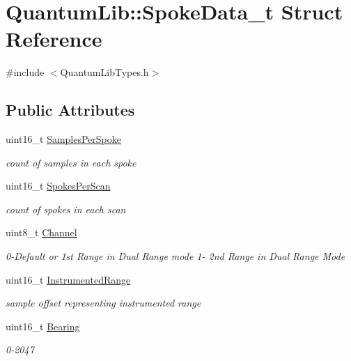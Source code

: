 \hypertarget{struct_quantum_lib_1_1_spoke_data__t}{}\section{Quantum\+Lib\+:\+:Spoke\+Data\+\_\+t Struct Reference}
\label{struct_quantum_lib_1_1_spoke_data__t}


{\ttfamily \#include $<$Quantum\+Lib\+Types.\+h$>$}

\subsection*{Public Attributes}
\begin{DoxyCompactItemize}
\item 
uint16\+\_\+t \mbox{\hyperlink{struct_quantum_lib_1_1_spoke_data__t_afa2843600eaccb38db739a8bd7e468dd}{Samples\+Per\+Spoke}}
\begin{DoxyCompactList}\small\item\em count of samples in each spoke \end{DoxyCompactList}\item 
uint16\+\_\+t \mbox{\hyperlink{struct_quantum_lib_1_1_spoke_data__t_abca160974e76a8a333a1927d1896fc69}{Spokes\+Per\+Scan}}
\begin{DoxyCompactList}\small\item\em count of spokes in each scan \end{DoxyCompactList}\item 
uint8\+\_\+t \mbox{\hyperlink{struct_quantum_lib_1_1_spoke_data__t_a235bdd0acf5a02fe888939c909de9566}{Channel}}
\begin{DoxyCompactList}\small\item\em 0-\/\+Default or 1st Range in Dual Range mode 1-\/ 2nd Range in Dual Range Mode \end{DoxyCompactList}\item 
uint16\+\_\+t \mbox{\hyperlink{struct_quantum_lib_1_1_spoke_data__t_a80aba4b609583225f67ab517f2962be5}{Instrumented\+Range}}
\begin{DoxyCompactList}\small\item\em sample offset representing instrumented range \end{DoxyCompactList}\item 
uint16\+\_\+t \mbox{\hyperlink{struct_quantum_lib_1_1_spoke_data__t_a591b1e8718daebd744cf8480f7776730}{Bearing}}
\begin{DoxyCompactList}\small\item\em 0-\/2047 \end{DoxyCompactList}\item 

\end{DoxyCompactItemize}
